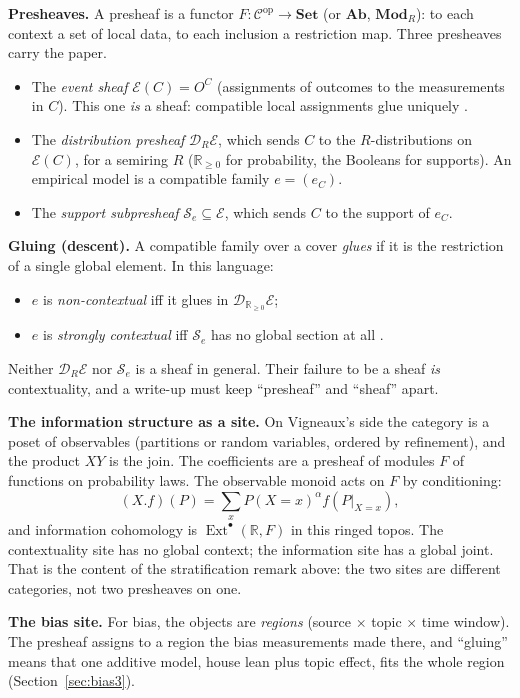 \documentclass[11pt]{article}
\theoremstyle{definition}
\theoremstyle{remark}
\newcommand{\R}{\mathbb{R}}
\begin{document}
\textbf{Presheaves.} A presheaf is a functor $F:\mathcal C^{\mathrm{op}}\to\mathbf{Set}$ (or $\mathbf{Ab}$, $\mathbf{Mod}_R$): to each context a set of local data, to each inclusion a restriction map. Three presheaves carry the paper.
\begin{itemize}
  \item The \emph{event sheaf} $\mathcal E(C)=O^C$ (assignments of outcomes to the measurements in $C$). This one \emph{is} a sheaf: compatible local assignments glue uniquely \cite{ab11}.
  \item The \emph{distribution presheaf} $\mathcal D_R\mathcal E$, which sends $C$ to the $R$-distributions on $\mathcal E(C)$, for a semiring $R$ ($\R_{\ge0}$ for probability, the Booleans for supports). An empirical model is a compatible family $e=(e_C)$.
  \item The \emph{support subpresheaf} $\mathcal S_e\subseteq\mathcal E$, which sends $C$ to the support of $e_C$.
\end{itemize}
\textbf{Gluing (descent).} A compatible family over a cover \emph{glues} if it is the restriction of a single global element. In this language:
\begin{itemize}
  \item $e$ is \emph{non-contextual} iff it glues in $\mathcal D_{\R_{\ge0}}\mathcal E$;
  \item $e$ is \emph{strongly contextual} iff $\mathcal S_e$ has no global section at all \cite{ab11}.
\end{itemize}
Neither $\mathcal D_R\mathcal E$ nor $\mathcal S_e$ is a sheaf in general. Their failure to be a sheaf \emph{is} contextuality, and a write-up must keep ``presheaf'' and ``sheaf'' apart.

\textbf{The information structure as a site.} On Vigneaux's side \cite{vig} the category is a poset of observables (partitions or random variables, ordered by refinement), and the product $XY$ is the join. The coefficients are a presheaf of modules $F$ of functions on probability laws. The observable monoid acts on $F$ by conditioning:
\[
(X.f)(P)=\textstyle\sum_xP(X{=}x)^\alpha f(P|_{X=x}),
\]
and information cohomology is $\operatorname{Ext}^\bullet(\R,F)$ in this ringed topos. The contextuality site has no global context; the information site has a global joint. That is the content of the stratification remark above: the two sites are different categories, not two presheaves on one.

\textbf{The bias site.} For bias, the objects are \emph{regions} (source $\times$ topic $\times$ time window). The presheaf assigns to a region the bias measurements made there, and ``gluing'' means that one additive model, house lean plus topic effect, fits the whole region (Section~\ref{sec:bias3}).
\end{document}

